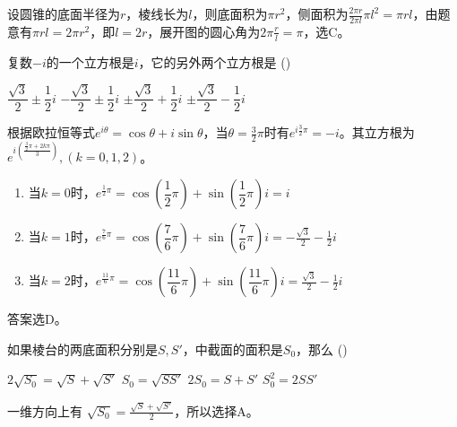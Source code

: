 \documentclass[answers]{exam}
\begin{document}
\begin{questions}
	\begin{solution}
		设圆锥的底面半径为$r$，棱线长为$l$，则底面积为$\pi r^2$，侧面积为$\frac{2\pi r}{2\pi l}\pi l^2 = \pi
			rl$，由题意有$\pi rl = 2\pi r^2$，即$l=2r$，展开图的圆心角为$2\pi\frac{r}{l}=\pi$，选C。
	\end{solution}

	\question 复数$-i$的一个立方根是$i$，它的另外两个立方根是 \hfill (\hspace{1cm})

	\begin{oneparchoices}
		\choice $\dfrac{\sqrt{3}}{2} \pm \dfrac12i$
		\choice $-\dfrac{\sqrt{3}}{2} \pm \dfrac12i$
		\choice $\pm\dfrac{\sqrt{3}}{2} + \dfrac12i$
		\CorrectChoice $\pm\dfrac{\sqrt{3}}{2} - \dfrac12i$
	\end{oneparchoices}

	\begin{solution}
		根据欧拉恒等式$e^{i\theta} = \cos\theta + i\sin\theta$，当$\theta=\frac32\pi$时有$e^{i\frac32\pi} =
			-i$。其立方根为$e^{i(\frac{\frac32\pi + 2k\pi}{3})}, (k=0,1,2)$。

		\begin{enumerate}[label=(\arabic*)]
			\item 当$k=0$时，$e^{\frac12\pi} = \cos \left( \dfrac12\pi \right) + \sin \left( \dfrac12\pi \right)i = i$
			\item 当$k=1$时，$e^{\frac76\pi} = \cos \left( \dfrac76\pi \right) + \sin \left( \dfrac76\pi \right)i =
				      -\frac{\sqrt{3}}{2} - \frac12i$
			\item 当$k=2$时，$e^{\frac{11}6\pi} = \cos \left( \dfrac{11}6\pi \right) + \sin \left( \dfrac{11}6\pi \right)i =
				      \frac{\sqrt{3}}{2} - \frac12i$
		\end{enumerate}
		答案选D。
	\end{solution}

	\question 如果棱台的两底面积分别是$S,S'$，中截面的面积是$S_0$，那么 \hfill (\hspace{1cm})

	\begin{oneparchoices}
		\CorrectChoice $2\sqrt{S_0} = \sqrt{S} + \sqrt{S'}$
		\choice $S_0 = \sqrt{SS'}$
		\choice $2S_0 = S + S'$
		\choice $S_0^2 = 2SS'$
	\end{oneparchoices}

	\begin{solution}
		一维方向上有 $\sqrt{S_0} = \frac{\sqrt{S} + \sqrt{S'}}{2}$，所以选择A。
	\end{solution}


\end{questions}
\end{document}
